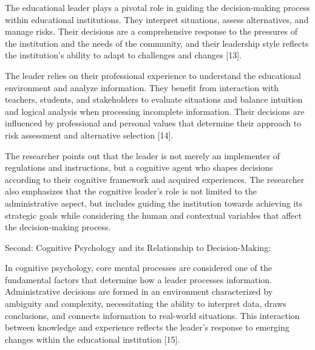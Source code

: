 \documentclass[10pt]{NSP1}
\begin{document}
\par\medskip{}\smallskip

The educational leader plays a pivotal role in guiding the decision-making process within educational institutions. They interpret situations, assess alternatives, and manage risks. Their decisions are a comprehensive response to the pressures of the institution and the needs of the community, and their leadership style reflects the institution's ability to adapt to challenges and changes [13].

The leader relies on their professional experience to understand the educational environment and analyze information. They benefit from interaction with teachers, students, and stakeholders to evaluate situations and balance intuition and logical analysis when processing incomplete information. Their decisions are influenced by professional and personal values that determine their approach to risk assessment and alternative selection [14].

The researcher points out that the leader is not merely an implementer of regulations and instructions, but a cognitive agent who shapes decisions according to their cognitive framework and acquired experiences. The researcher also emphasizes that the cognitive leader's role is not limited to the administrative aspect, but includes guiding the institution towards achieving its strategic goals while considering the human and contextual variables that affect the decision-making process.

Second: Cognitive Psychology and its Relationship to Decision-Making:

\par\medskip{}\smallskip

In cognitive psychology, core mental processes are considered one of the fundamental factors that determine how a leader processes information. Administrative decisions are formed in an environment characterized by ambiguity and complexity, necessitating the ability to interpret data, draws conclusions, and connects information to real-world situations. This interaction between knowledge and experience reflects the leader's response to emerging changes within the educational institution [15].
\end{document}
